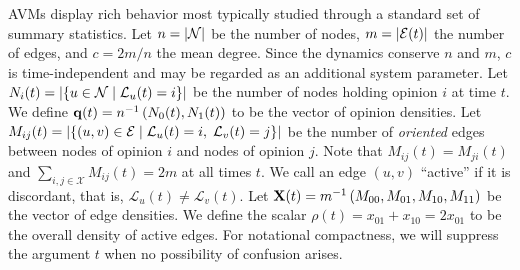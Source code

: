 \documentclass[review, onefignum, onetabnum]{siamart171218}
\begin{document}
	AVMs display rich behavior most typically studied through a standard set of summary statistics.  
	Let $n = \left|\mathcal{N}\right|$ be the number of nodes, $m = \left|\mathcal{E}(t)\right|$ the number of edges, and $c = {2m}/{n}$ the mean degree.
	Since the dynamics conserve $n$ and $m$, $c$ is time-independent and may be regarded as an additional system parameter. 
	Let $N_i(t) = \left|\{u \in \mathcal{N} \;|\;\mathcal{L}_u(t) = i \}\right|$ be the number of nodes holding opinion $i$ at time $t$. 
	We define $\mathbf{q}(t) = n^{-1}\left(N_0(t), N_1(t)\right)$ to be the vector of opinion densities.
	Let $M_{ij}(t) = \left|\{(u,v) \in \mathcal{E} \;|\; \mathcal{L}_u(t) = i,\; \mathcal{L}_v(t) = j \}\right|$ be the number of \emph{oriented} edges between nodes of opinion $i$ and nodes of opinion $j$. 
	Note that $M_{ij}(t) = M_{ji}(t)$ and $\sum_{i,j \in \mathcal{X}} M_{ij}(t) = 2m$ at all times $t$.
	We call an edge $(u,v)$ ``active'' if it is discordant, that is, $\mathcal{L}_u(t) \neq \mathcal{L}_v(t)$. 
	Let $\mathbf{X}(t) = m^{-1}\left(M_{00}, M_{01}, M_{10}, M_{11}\right)$ be the vector of edge densities. 
	We define the scalar $\rho(t) = x_{01} + x_{10} = 2x_{01}$ to be the overall density of active edges. 
	For notational compactness, we will suppress the argument $t$ when no possibility of confusion arises.
	
\end{document}
